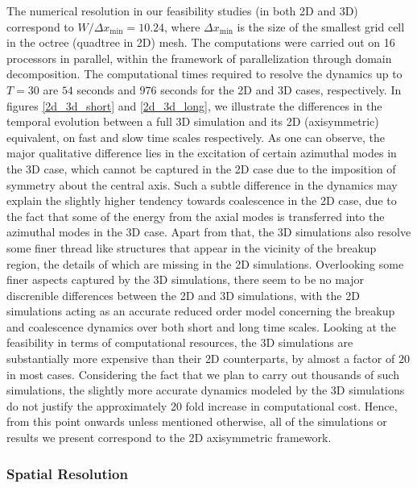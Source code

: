The numerical resolution in our feasibility studies (in both 2D and 3D) correspond to 
$W / \Delta x_{\textrm{min}} = 10.24$, where $\Delta x_{\textrm{min}}$ is the size 
of the smallest grid cell in the octree (quadtree in 2D) mesh. 
The computations were carried out on 16 processors in parallel, within the framework
of parallelization through domain decomposition.
The computational times required to resolve the dynamics up to $T = 30$ are $54$ seconds 
and $976$ seconds for the 2D and 3D cases, respectively. 
In figures \ref{2d_3d_short} and \ref{2d_3d_long}, we illustrate the differences 
in the temporal evolution between a full 3D simulation and its 2D (axisymmetric)
equivalent, on fast and slow time scales respectively. 
As one can observe, the major qualitative difference 
lies in the excitation of certain azimuthal modes in the 3D case, 
which cannot be captured in the 2D case due to the 
imposition of symmetry about the central axis.
Such a subtle difference in the dynamics may 
explain the slightly higher tendency towards coalescence 
in the 2D case, due to the fact that some of the energy from 
the axial modes is transferred into the azimuthal modes in the 3D case. 
Apart from that, the 3D simulations also resolve some 
finer thread like structures that appear in the vicinity 
of the breakup region, the details of which are missing in the 2D simulations.  
Overlooking some finer aspects captured by the 3D simulations,  
there seem to be no major discrenible differences between the 2D and 3D simulations,
with the 2D simulations acting as an accurate reduced order model concerning the 
breakup and coalescence dynamics over both short and long time scales.
Looking at the feasibility in terms of computational resources, the 3D simulations 
are substantially more expensive than their 2D counterparts, by almost a factor of $20$ in most cases. 
Considering the fact that we plan to carry out thousands of such simulations, the 
slightly more accurate dynamics modeled by the 3D simulations do not justify the
approximately 20 fold increase in computational cost.   
Hence, from this point onwards unless mentioned otherwise, all of the 
simulations or results we present correspond to the 2D axisymmetric framework.




\subsubsection*{Spatial Resolution}

